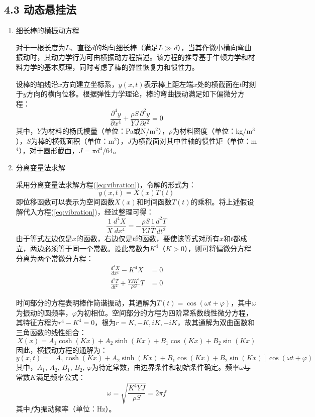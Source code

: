 \documentclass[11pt]{article}
\begin{document}
\subsection*{4.3 动态悬挂法}
\begin{enumerate}
\item 细长棒的横振动方程 \par
对于一根长度为$L$、直径$d$的均匀细长棒（满足$L \gg d$），当其作微小横向弯曲振动时，其动力学行为可由横振动方程描述。该方程的推导基于牛顿力学和材料力学的基本原理，同时考虑了棒的弹性恢复力和惯性力。

设棒的轴线沿$x$方向建立坐标系，$y(x,t)$表示棒上距左端$x$处的横截面在$t$时刻于$y$方向的横向位移。根据弹性力学理论，棒的弯曲振动满足如下偏微分方程：
\begin{equation}
\frac{\partial^4 y}{\partial x^4} + \frac{\rho S}{YJ} \frac{\partial^2 y}{\partial t^2} = 0
\label{eq:vibration}
\end{equation}
其中，$Y$为材料的杨氏模量（单位：Pa或N/m$^2$），$\rho$为材料密度（单位：kg/m$^3$），$S$为棒的横截面积（单位：m$^2$），$J$为横截面对其中性轴的惯性矩（单位：m$^4$），对于圆形截面，$J = \pi d^4 / 64$。

\item 分离变量法求解\par
采用分离变量法求解方程(\ref{eq:vibration})，令解的形式为：
\begin{equation}
y(x,t) = X(x) T(t)
\end{equation}
即位移函数可以表示为空间函数$X(x)$和时间函数$T(t)$的乘积。将上述假设解代入方程(\ref{eq:vibration})，经过整理可得：
\begin{equation}
\frac{1}{X} \frac{d^4 X}{d x^4} = -\frac{\rho S}{YJ} \frac{1}{T} \frac{d^2 T}{d t^2}
\end{equation}
由于等式左边仅是$x$的函数，右边仅是$t$的函数，要使该等式对所有$x$和$t$都成立，两边必须等于同一个常数。设此常数为$K^4$（$K>0$），则可将偏微分方程分离为两个常微分方程：
\begin{align}
\frac{d^4 X}{d x^4} - K^4 X &= 0 \\
\frac{d^2 T}{d t^2} + \frac{YJ K^4}{\rho S} T &= 0
\end{align}

时间部分的方程表明棒作简谐振动，其通解为$T(t) = \cos(\omega t + \varphi)$，其中$\omega$为振动的圆频率，$\varphi$为初相位。空间部分的方程为四阶常系数线性微分方程，其特征方程为$r^4 - K^4 = 0$，根为$r = K, -K, iK, -iK$，故其通解为双曲函数和三角函数的线性组合：
\begin{equation}
X(x) = A_1 \cosh(Kx) + A_2 \sinh(Kx) + B_1 \cos(Kx) + B_2 \sin(Kx)
\end{equation}
因此，横振动方程的通解为：
\begin{equation}
y(x,t) = \left[ A_1 \cosh(Kx) + A_2 \sinh(Kx) + B_1 \cos(Kx) + B_2 \sin(Kx) \right] \cos(\omega t + \varphi)
\label{eq:general_solution}
\end{equation}
其中，$A_1$, $A_2$, $B_1$, $B_2$, $\varphi$为待定常数，由边界条件和初始条件确定。频率$\omega$与常数$K$满足频率公式：
\begin{equation}
\omega = \sqrt{\frac{K^4 Y J}{\rho S}} = 2\pi f
\label{eq:frequency}
\end{equation}
其中$f$为振动频率（单位：Hz）。


\end{enumerate}
\end{document}
